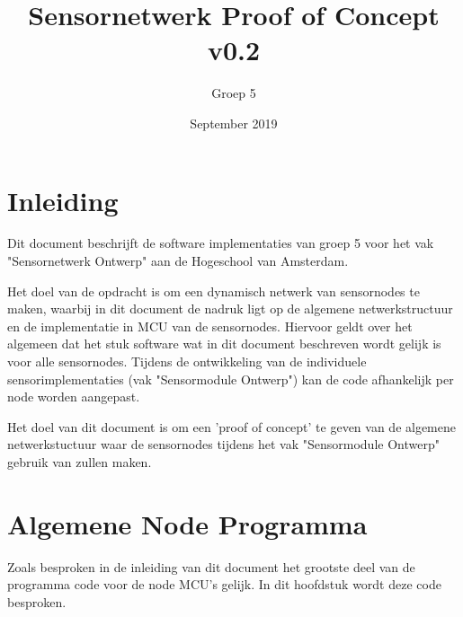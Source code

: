 \documentclass[a4paper, 11pt]{article}
\title{Sensornetwerk Proof of Concept v0.2}
\author{Groep 5}
\date{September 2019}
\begin{document}
\maketitle
\clearpage
{}
\clearpage

\section{Inleiding}
Dit document beschrijft de software implementaties van groep 5 voor het vak "Sensornetwerk Ontwerp" aan de Hogeschool van Amsterdam.

Het doel van de opdracht is om een dynamisch netwerk van sensornodes te maken, waarbij in dit document de nadruk ligt op de algemene netwerkstructuur en de implementatie in MCU van de sensornodes. Hiervoor geldt over het algemeen dat het stuk software wat in dit document beschreven wordt gelijk is voor alle sensornodes. Tijdens de ontwikkeling van de individuele sensorimplementaties (vak "Sensormodule Ontwerp") kan de code afhankelijk per node worden aangepast. 

Het doel van dit document is om een 'proof of concept' te geven van de algemene netwerkstuctuur waar de sensornodes tijdens het vak "Sensormodule Ontwerp" gebruik van zullen maken.

\section{Algemene Node Programma}
Zoals besproken in de inleiding van dit document het grootste deel van de programma code voor de node MCU's gelijk. In dit hoofdstuk wordt deze code besproken. 
\end{document}
